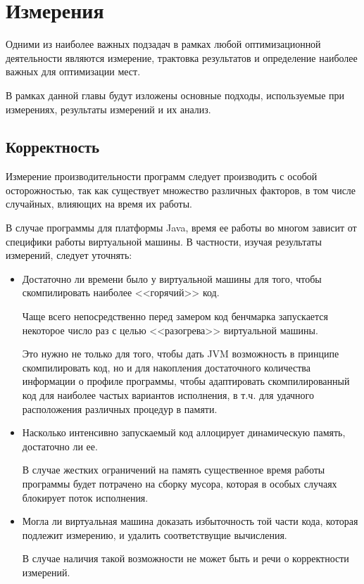 \newpage
\section{Измерения}
Одними из наиболее важных подзадач в рамках любой оптимизационной деятельности являются измерение,
трактовка результатов и определение наиболее важных для оптимизации мест.

В рамках данной главы будут изложены основные подходы, используемые при измерениях, результаты
измерений и их анализ.

\subsection{Корректность}
Измерение производительности программ следует производить с особой осторожностью, так как существует
множество различных факторов, в том числе случайных, влияющих на время их работы.

В случае программы для платформы Java, время ее работы во многом зависит от специфики работы
виртуальной машины.
В частности, изучая результаты измерений, следует уточнять:
\begin{itemize}
    \item Достаточно ли времени было у виртуальной машины для того, чтобы скомпилировать наиболее
    <<горячий>> код.

    Чаще всего непосредственно перед замером код бенчмарка запускается некоторое число раз с целью
    <<разогрева>> виртуальной машины.

    Это нужно не только для того, чтобы дать JVM возможность в принципе скомпилировать код, но и
    для накопления достаточного количества информации о профиле программы, чтобы адаптировать
    скомпилированный код для наиболее частых вариантов исполнения, в т.ч. для удачного расположения
    различных процедур в памяти.

    \item Насколько интенсивно запускаемый код аллоцирует динамическую память, достаточно ли ее.

    В случае жестких ограничений на память существенное время работы программы будет потрачено
    на сборку мусора, которая в особых случаях блокирует поток исполнения.

    \item Могла ли виртуальная машина доказать избыточность той части кода, которая подлежит
    измерению, и удалить соответствущие вычисления.

    В случае наличия такой возможности не может быть и речи о корректности измерений.
\end{itemize}

